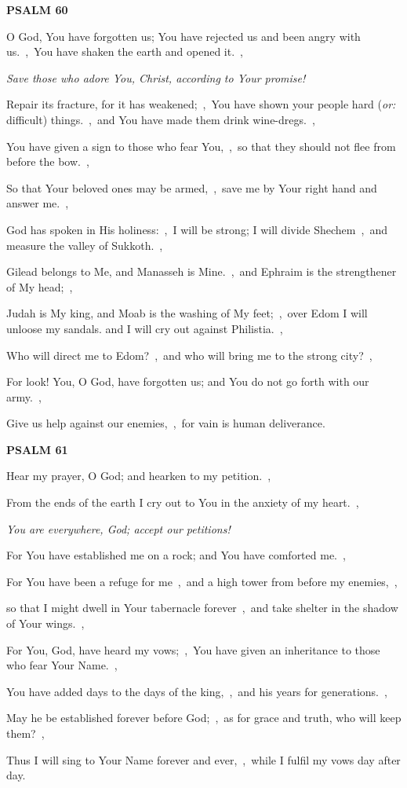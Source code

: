 \documentclass[12pt,twoside,a5paper]{article}
\newcommand{\psalm}[1]{\textbf{PSALM {#1}}\nopagebreak}
\newcommand{\qanona}[1]{{\liturgicalhint{Qanona.} \emph{#1}}}
\newcommand{\translationoption}[1]{\emph{or:} #1}
\begin{document}
\psalm{60}

\begin{normalparskip}
  O God, You have forgotten us; You have rejected us and been angry with us.~\sep\ You have shaken the earth and opened it.~\sep

  \qanona{Save those who adore You, Christ, according to Your promise!}

  Repair its fracture, for it has weakened;~\sep\ You have shown your people hard (\translationoption{difficult}) things.~\sep\ and You have made them drink wine-dregs.~\sep

  You have given a sign to those who fear You,~\sep\ so that they should not flee from before the bow.~\sep

  So that Your beloved ones may be armed,~\sep\ save me by Your right hand and answer me.~\sep

  God has spoken in His holiness:~\sep\ I will be strong; I will divide Shechem~\sep\ and measure the valley of Sukkoth.~\sep

  Gilead belongs to Me, and Manasseh is Mine.~\sep\ and Ephraim is the strengthener of My head;~\sep

  Judah is My king, and Moab is the washing of My feet;~\sep\ over Edom I will unloose my sandals. and I will cry out against Philistia.~\sep

  Who will direct me to Edom?~\sep\ and who will bring me to the strong city?~\sep

  For look! You, O God, have forgotten us; and You do not go forth with our army.~\sep

  Give us help against our enemies,~\sep\ for vain is human deliverance.
\end{normalparskip}

\psalm{61}

\begin{normalparskip}
  Hear my prayer, O God; and hearken to my petition.~\sep

  From the ends of the earth I cry out to You in the anxiety of my heart.~\sep

  \qanona{You are everywhere, God; accept our petitions!}

  For You have established me on a rock; and You have comforted me.~\sep

  For You have been a refuge for me~\sep\ and a high tower from before my enemies,~\sep

  so that I might dwell in Your tabernacle forever~\sep\ and take shelter in the shadow of Your wings.~\sep

  For You, God, have heard my vows;~\sep\ You have given an inheritance to those who fear Your Name.~\sep

  You have added days to the days of the king,~\sep\ and his years for generations.~\sep

  May he be established forever before God;~\sep\ as for grace and truth, who will keep them?~\sep

  Thus I will sing to Your Name forever and ever,~\sep\ while I fulfil my vows day after day.
\end{normalparskip}
\end{document}
